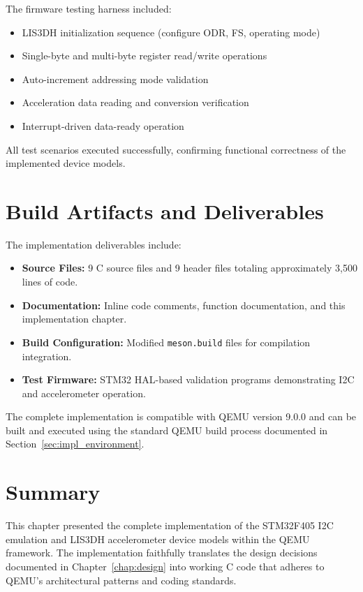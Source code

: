 The firmware testing harness included:
\begin{itemize}
\item LIS3DH initialization sequence (configure ODR, FS, operating mode)
\item Single-byte and multi-byte register read/write operations
\item Auto-increment addressing mode validation
\item Acceleration data reading and conversion verification
\item Interrupt-driven data-ready operation
\end{itemize}

All test scenarios executed successfully, confirming functional correctness of the implemented device models.


\section{Build Artifacts and Deliverables}

\label{sec:impl_artifacts}

The implementation deliverables include:

\begin{itemize}
\item \textbf{Source Files:} 9 C source files and 9 header files totaling approximately 3,500 lines of code.
\item \textbf{Documentation:} Inline code comments, function documentation, and this implementation chapter.
\item \textbf{Build Configuration:} Modified \texttt{meson.build} files for compilation integration.
\item \textbf{Test Firmware:} STM32 HAL-based validation programs demonstrating I2C and accelerometer operation.
\end{itemize}

The complete implementation is compatible with QEMU version 9.0.0 and can be built and executed using the standard QEMU build process documented in Section~\ref{sec:impl_environment}.


\section{Summary}

This chapter presented the complete implementation of the STM32F405 I2C emulation and LIS3DH accelerometer device models within the QEMU framework. The implementation faithfully translates the design decisions documented in Chapter~\ref{chap:design} into working C code that adheres to QEMU's architectural patterns and coding standards.

